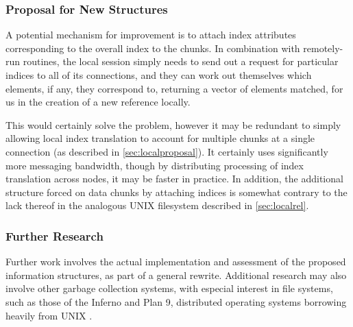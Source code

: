 \subsubsection{Proposal for New Structures}\label{proposal-for-new-structures}

A potential mechanism for improvement is to attach index attributes corresponding to the overall index to the chunks.
In combination with remotely-run routines, the local session simply needs to send out a request for particular indices to all of its connections, and they can work out themselves which elements, if any, they correspond to, returning a vector of elements matched, for us in the creation of a new reference locally.

This would certainly solve the problem, however it may be redundant to simply allowing local index translation to account for multiple chunks at a single connection (as described in \cref{sec:localproposal}).
It certainly uses significantly more messaging bandwidth, though by distributing processing of index translation across nodes, it may be faster in practice.
In addition, the additional structure forced on data chunks by attaching indices is somewhat contrary to the lack thereof in the analogous UNIX filesystem described in \cref{sec:localrel}.

\subsubsection{Further Research}\label{further-research}

Further work involves the actual implementation and assessment of the proposed information structures, as part of a general rewrite.
Additional research may also involve other garbage collection systems, with especial interest in file systems, such as those of the Inferno and Plan 9, distributed operating systems borrowing heavily from UNIX \cites{dorward1997inferno,pike1995plan}.

